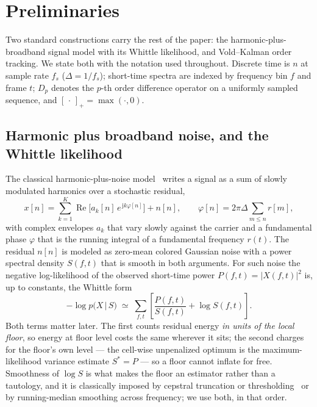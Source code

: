 \documentclass[journal]{IEEEtran}
\begin{document}
\section{Preliminaries}
\label{sec:prelim}

Two standard constructions carry the rest of the paper: the
harmonic-plus-broadband signal model with its Whittle likelihood, and
Vold--Kalman order tracking. We state both with the notation used
throughout. Discrete time is $n$ at sample rate $f_s$
($\Delta = 1/f_s$); short-time spectra are indexed by frequency bin $f$
and frame $t$; $D_p$ denotes the $p$-th order difference operator on a
uniformly sampled sequence, and $[\,\cdot\,]_+ = \max(\cdot, 0)$.

\subsection{Harmonic plus broadband noise, and the Whittle likelihood}
\label{sec:prelim-hpn}

The classical harmonic-plus-noise model~\cite{serra1990sms,
stylianou2001hnm} writes a signal as a sum of slowly modulated
harmonics over a stochastic residual,
\begin{equation}
  x[n] = \sum_{k=1}^{K} \operatorname{Re}\!\big[ a_k[n]\,
    e^{\,\mathrm{j} k \varphi[n]} \big] + n[n],
  \qquad
  \varphi[n] = 2\pi\Delta\!\!\sum_{m\le n}\!\! r[m],
  \label{eq:hpn}
\end{equation}
with complex envelopes $a_k$ that vary slowly against the carrier and a
fundamental phase $\varphi$ that is the running integral of a
fundamental frequency $r(t)$. The residual $n[n]$ is modeled as
zero-mean colored Gaussian noise with a power spectral density
$S(f,t)$ that is smooth in both arguments. For such noise the
negative log-likelihood of the observed short-time power
$P(f,t) = |X(f,t)|^2$ is, up to constants, the Whittle
form~\cite{whittle1953}
\begin{equation}
  -\log p\big(X \,\big|\, S\big) \;\simeq\;
  \sum_{f,t} \left[ \frac{P(f,t)}{S(f,t)} + \log S(f,t) \right].
  \label{eq:whittle}
\end{equation}
Both terms matter later. The first counts residual energy \emph{in
units of the local floor}, so energy at floor level costs the same
wherever it sits; the second charges for the floor's own level --- the
cell-wise unpenalized optimum is the maximum-likelihood variance
estimate $S^\ast = P$ --- so a floor cannot inflate for free.
Smoothness of $\log S$ is what makes the floor an estimator rather than
a tautology, and it is classically imposed by cepstral truncation or
thresholding~\cite{stoica2006cepstrum} or by running-median smoothing
across frequency; we use both, in that order.
\end{document}
